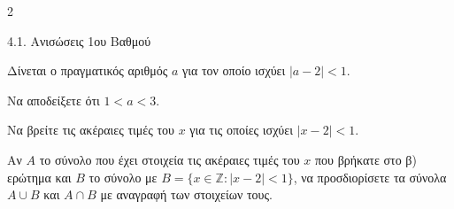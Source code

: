 \begin{ylh}{2}
    \item 4.1. Ανισώσεις 1ου Βαθμού
\end{ylh}
Δίνεται ο πραγματικός αριθμός $a$ για τον οποίο ισχύει $|a - 2| < 1$.
\begin{alist}
\item Να αποδείξετε ότι $1 < a < 3$.
\item Να βρείτε τις ακέραιες τιμές του $x$ για τις οποίες ισχύει $|x - 2| < 1$.
\item Αν $A$ το σύνολο που έχει στοιχεία τις ακέραιες τιμές του $x$ που βρήκατε στο β) ερώτημα και $B$ το σύνολο με $B = \{x \in \mathbb{Z}: |x-2| < 1\}$, να προσδιορίσετε τα σύνολα $A \cup B$ και $A \cap B$ με αναγραφή των στοιχείων τους.
\end{alist}

